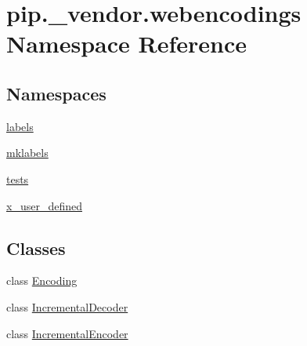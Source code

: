 \hypertarget{namespacepip_1_1__vendor_1_1webencodings}{}\section{pip.\+\_\+vendor.\+webencodings Namespace Reference}
\label{namespacepip_1_1__vendor_1_1webencodings}
\subsection*{Namespaces}
\begin{DoxyCompactItemize}
\item 
 \hyperlink{namespacepip_1_1__vendor_1_1webencodings_1_1labels}{labels}
\item 
 \hyperlink{namespacepip_1_1__vendor_1_1webencodings_1_1mklabels}{mklabels}
\item 
 \hyperlink{namespacepip_1_1__vendor_1_1webencodings_1_1tests}{tests}
\item 
 \hyperlink{namespacepip_1_1__vendor_1_1webencodings_1_1x__user__defined}{x\+\_\+user\+\_\+defined}
\end{DoxyCompactItemize}
\subsection*{Classes}
\begin{DoxyCompactItemize}
\item 
class \hyperlink{classpip_1_1__vendor_1_1webencodings_1_1Encoding}{Encoding}
\item 
class \hyperlink{classpip_1_1__vendor_1_1webencodings_1_1IncrementalDecoder}{Incremental\+Decoder}
\item 
class \hyperlink{classpip_1_1__vendor_1_1webencodings_1_1IncrementalEncoder}{Incremental\+Encoder}
\end{DoxyCompactItemize}

